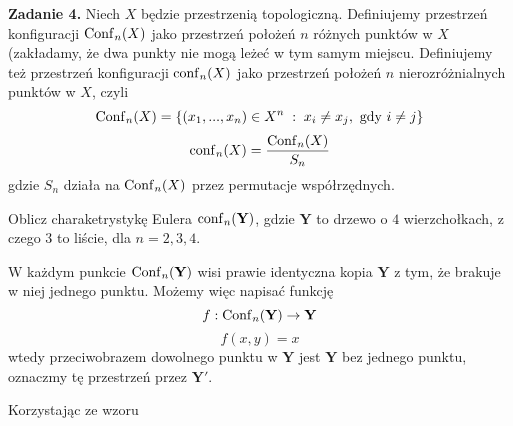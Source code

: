 \textbf{\large\color{orange}Zadanie 4.} Niech $X$ będzie przestrzenią topologiczną. Definiujemy przestrzeń konfiguracji $\operatorname{Conf}_n(X)$ jako przestrzeń położeń $n$ różnych punktów w $X$ (zakładamy, że dwa punkty nie mogą leżeć w tym samym miejscu. Definiujemy też przestrzeń konfiguracji $\operatorname{conf}_n(X)$ jako przestrzeń położeń $n$ nierozróżnialnych punktów w $X$, czyli
$$\operatorname{Conf}_n(X)=\{(x_1,...,x_n)\in X^n\;:\;x_i\neq x_j, \text{ gdy }i\neq j\}$$
$$\operatorname{conf}_n(X)=\frac{\operatorname{Conf}_n(X)}{S_n}$$
gdzie $S_n$ działa na $\operatorname{Conf}_n(X)$ przez permutacje współrzędnych.

Oblicz charaketrystykę Eulera $\operatorname{conf}_n(\mathbf{Y})$, gdzie $\mathbf{Y}$ to drzewo o $4$ wierzchołkach, z czego $3$ to liście, dla $n=2,3,4$.

\dotfill

W każdym punkcie $\operatorname{Conf}_n(\mathbf{Y})$ wisi prawie identyczna kopia $\mathbf{Y}$ z tym, że brakuje w niej jednego punktu. Możemy więc napisać funkcję
$$f:\operatorname{Conf}_n(\mathbf{Y})\to \mathbf{Y}$$
$$f(x, y)=x$$
wtedy przeciwobrazem dowolnego punktu w $\mathbf{Y}$ jest $\mathbf{Y}$ bez jednego punktu, oznaczmy tę przestrzeń przez $\mathbf{Y}'$.

Korzystając ze wzoru
